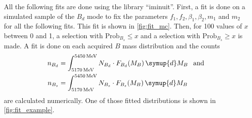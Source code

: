 All the following fits are done using the library \enquote{iminuit}\cite{iminuit}.
First, a fit is done on a simulated sample of the $B_d$ mode to fix the parameters $f_1,f_2,\beta_1,\beta_2,m_1$ and $m_2$ for all the following fits. 
This fit is shown in \cref{fig:fit_mc}.
Then, for 100 values of $x$ between 0 and 1, a selection with $\text{Prob}_{B_s} \leq x$ and a selection with $\text{Prob}_{B_s} \geq x$ is made.
A fit is done on each acquired $B$ mass distribution and the counts
\begin{align}
    n_{B_d} &= \int_{\qty{5170}{\MeV}}^{\qty{5450}{\MeV}} N_{B_d} \cdot F_{B_d}(M_B) \, \symup{d}M_B \:\:\text{ and} \\
    n_{B_s} &= \int_{\qty{5170}{\MeV}}^{\qty{5450}{\MeV}} N_{B_s} \cdot F_{B_s}(M_B) \, \symup{d}M_B
\end{align}
are calculated numerically.
One of those fitted distributions is shown in \cref{fig:fit_example}.

